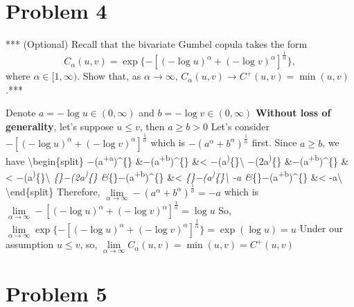 \documentclass[11pt]{article}
\begin{document}
    \hypertarget{problem-4}{%
\section{Problem 4}\label{problem-4}}

    *** (Optional) Recall that the bivariate Gumbel copula takes the form
\[C_{\alpha}(u,v) = \exp\{−[(−\log u)^\alpha +(−\log v)^\alpha]^{\frac{1}{\alpha}} \},
\] where \(\alpha \in [1,\infty)\). Show that, as
\(\alpha \rightarrow \infty\),
\(C_\alpha(u,v) \rightarrow C^+(u,v) = \min(u,v)\).***

    Denote \(a = −\log u \in (0,\infty)\) and \(b = −\log v \in (0,\infty)\)
\textbf{Without loss of generality}, let's suppose \(u\leq v\), then
\(a\geq b >0\) Let's consider
\(−[(−\log u)^\alpha +(−\log v)^\alpha]^{\frac{1}{\alpha}}\) which is
\(−(a^\alpha +b^\alpha)^{\frac{1}{\alpha}}\) first. Since \(a\geq b\),
we have \textbackslash{}begin\{split\}
−(a\textsuperscript{\alpha +a}\alpha)\^{}\{\}
\&\leq −(a\textsuperscript{\alpha +b}\alpha)\^{}\{\}
\&\textless{}
−(a\textsuperscript{\alpha )}\{\}\textbackslash{}
−(2a\textsuperscript{\alpha)}\{\}
\&\leq −(a\textsuperscript{\alpha +b}\alpha)\^{}\{\}
\&\textless{}
−(a\textsuperscript{\alpha )}\{\}\textbackslash{}
\lim\emph{\{\alpha\rightarrow\infty\}−(2a\textsuperscript{\alpha)}\{\}
\&\leq \lim}\{\alpha\rightarrow\infty\}−(a\textsuperscript{\alpha +b}\alpha)\^{}\{\}
\&\textless{}
\lim\emph{\{\alpha\rightarrow\infty\}−(a\textsuperscript{\alpha )}\{\}\textbackslash{}
-a
\&\leq \lim}\{\alpha\rightarrow\infty\}−(a\textsuperscript{\alpha +b}\alpha)\^{}\{\}
\&\textless{} -a\textbackslash{} \textbackslash{}end\{split\} Therefore,
\(\lim\limits_{\alpha\rightarrow\infty}−(a^\alpha +b^\alpha)^{\frac{1}{\alpha}} = -a\)
which is
\(\lim\limits_{\alpha\rightarrow\infty}−[(−\log u)^\alpha +(−\log v)^\alpha]^{\frac{1}{\alpha}} = \log u\)
So,
\(\lim\limits_{\alpha\rightarrow\infty}\exp\{−[(−\log u)^\alpha +(−\log v)^\alpha]^{\frac{1}{\alpha}} \} = \exp (\log u)=u\)
Under our assumption \(u\leq v\), so,
\(\lim\limits_{\alpha\rightarrow\infty}C_\alpha(u,v) = \min(u,v) = C^+(u,v)\)

    \hypertarget{problem-5}{%
\section{Problem 5}\label{problem-5}}
\end{document}
